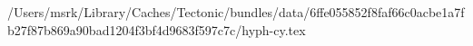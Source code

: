 /Users/msrk/Library/Caches/Tectonic/bundles/data/6ffe055852f8faf66c0acbe1a7fb27f87b869a90bad1204f3bf4d9683f597c7c/hyph-cy.tex